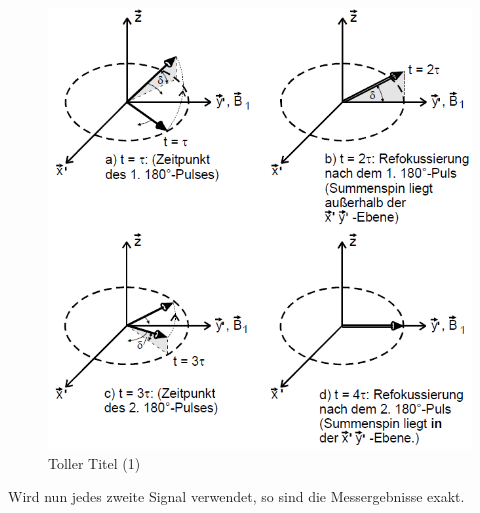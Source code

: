 \documentclass[]{scrartcl}
\begin{document}
\begin{figure}[H]
\centering
\includegraphics[width=14cm]{images/Meiboom_Gill_Methode.png}
\caption{Toller Titel (1)}
\label{fig::Meiboom_Gill_Methode}
\end{figure}
Wird nun jedes zweite Signal verwendet, so sind die Messergebnisse exakt.
\end{document}
